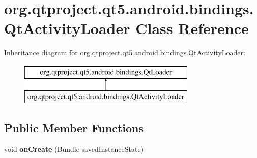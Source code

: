 \hypertarget{classorg_1_1qtproject_1_1qt5_1_1android_1_1bindings_1_1_qt_activity_loader}{}\section{org.\+qtproject.\+qt5.\+android.\+bindings.\+Qt\+Activity\+Loader Class Reference}
\label{classorg_1_1qtproject_1_1qt5_1_1android_1_1bindings_1_1_qt_activity_loader}
Inheritance diagram for org.\+qtproject.\+qt5.\+android.\+bindings.\+Qt\+Activity\+Loader\+:\begin{figure}[H]
\begin{center}
\leavevmode
\includegraphics[height=2.000000cm]{classorg_1_1qtproject_1_1qt5_1_1android_1_1bindings_1_1_qt_activity_loader}
\end{center}
\end{figure}
\subsection*{Public Member Functions}
\begin{DoxyCompactItemize}
\item 
\mbox{\label{classorg_1_1qtproject_1_1qt5_1_1android_1_1bindings_1_1_qt_activity_loader_ab1a13fd4c189a54872dda7a6a5f9564a}} 
void {\bfseries on\+Create} (Bundle saved\+Instance\+State)
\end{DoxyCompactItemize}
